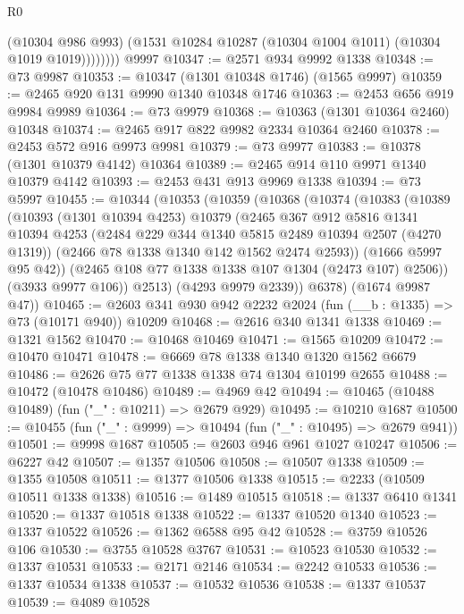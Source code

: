\begin{lexlean}{R0}
\begin{coremodule}
                (@10304 @986 @993)
                (@1531 @10284 @10287 (@10304 @1004 @1011) (@10304 @1019 @1019))))))))
    @9997
@10347 := @2571 @934 @9992 @1338
@10348 := @73 @9987
@10353 := @10347 (@1301 @10348 @1746) (@1565 @9997)
@10359 := @2465 @920 @131 @9990 @1340 @10348 @1746
@10363 := @2453 @656 @919 @9984 @9989
@10364 := @73 @9979
@10368 := @10363 (@1301 @10364 @2460) @10348
@10374 := @2465 @917 @822 @9982 @2334 @10364 @2460
@10378 := @2453 @572 @916 @9973 @9981
@10379 := @73 @9977
@10383 := @10378 (@1301 @10379 @4142) @10364
@10389 := @2465 @914 @110 @9971 @1340 @10379 @4142
@10393 := @2453 @431 @913 @9969 @1338
@10394 := @73 @5997
@10455 := @10344
    (@10353
      (@10359
        (@10368
          (@10374
            (@10383
              (@10389
                (@10393
                  (@1301 @10394 @4253)
                  @10379
                  (@2465
                    @367
                    @912
                    @5816
                    @1341
                    @10394
                    @4253
                    (@2484 @229 @344 @1340 @5815 @2489 @10394 @2507 (@4270 @1319))
                    (@2466 @78 @1338 @1340 @142 @1562 @2474 @2593))
                  (@1666 @5997 @95 @42))
                (@2465 @108 @77 @1338 @1338 @107 @1304 (@2473 @107) @2506))
              (@3933 @9977 @106))
            @2513)
          (@4293 @9979 @2339))
        @6378)
      (@1674 @9987 @47))
@10465 := @2603 @341 @930 @942 @2232 @2024 (fun (__b : @1335) => @73 (@10171 @940)) @10209
@10468 := @2616 @340 @1341 @1338
@10469 := @1321 @1562
@10470 := @10468 @10469
@10471 := @1565 @10209
@10472 := @10470 @10471
@10478 := @6669 @78 @1338 @1340 @1320 @1562 @6679
@10486 := @2626 @75 @77 @1338 @1338 @74 @1304 @10199 @2655
@10488 := @10472 (@10478 @10486)
@10489 := @4969 @42
@10494 := @10465 (@10488 @10489) (fun ("_" : @10211) => @2679 @929)
@10495 := @10210 @1687
@10500 := @10455 (fun ("_" : @9999) => @10494 (fun ("_" : @10495) => @2679 @941))
@10501 := @9998 @1687
@10505 := @2603 @946 @961 @1027 @10247
@10506 := @6227 @42
@10507 := @1357 @10506
@10508 := @10507 @1338
@10509 := @1355 @10508
@10511 := @1377 @10506 @1338
@10515 := @2233 (@10509 @10511 @1338 @1338)
@10516 := @1489 @10515
@10518 := @1337 @6410 @1341
@10520 := @1337 @10518 @1338
@10522 := @1337 @10520 @1340
@10523 := @1337 @10522
@10526 := @1362 @6588 @95 @42
@10528 := @3759 @10526 @106
@10530 := @3755 @10528 @3767
@10531 := @10523 @10530
@10532 := @1337 @10531
@10533 := @2171 @2146
@10534 := @2242 @10533
@10536 := @1337 @10534 @1338
@10537 := @10532 @10536
@10538 := @1337 @10537
@10539 := @4089 @10528

\end{coremodule}
\end{lexlean}
